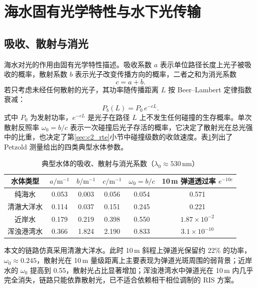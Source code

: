 \section{海水固有光学特性与水下光传输}
\label{sec:c2_water}

\subsection{吸收、散射与消光}

海水对光的作用由固有光学特性描述。吸收系数 $a$ 表示单位路径长度上光子被吸收的概率，散射系数 $b$ 表示光子改变传播方向的概率，二者之和为消光系数
\begin{equation}
c=a+b.
\label{eq:c2_extinction}
\end{equation}
若只考虑未经任何散射的光子，其功率随传播距离 $L$ 按 Beer--Lambert 定律指数衰减：
\begin{equation}
P_b(L)=P_0\,e^{-cL}.
\label{eq:c2_beer}
\end{equation}
式中 $P_0$ 为发射功率，$e^{-cL}$ 是光子在路径 $L$ 上不发生任何碰撞的生存概率。单次散射反照率 $\omega_0=b/c$ 表示一次碰撞后光子存活的概率，它决定了散射光在总光强中的比重，也决定了第\ref{sec:c2_rte}小节中碰撞级数的收敛速度。表\ref{tab:c2_iop}列出了 Petzold 测量给出的四类典型水体参数。

\begin{table}[htbp]
\caption{典型水体的吸收、散射与消光系数（$\lambda_0\approx530\,\mathrm{nm}$）}
\label{tab:c2_iop}
\centering
\begin{tabular}{cccccc}
\toprule
水体类型 & $a/\mathrm{m^{-1}}$ & $b/\mathrm{m^{-1}}$ & $c/\mathrm{m^{-1}}$ & $\omega_0=b/c$ & 10\,m 弹道透过率 $e^{-10c}$ \\
\midrule
纯海水 & 0.053 & 0.003 & 0.056 & 0.054 & 0.571 \\
清澈大洋水 & 0.114 & 0.037 & 0.151 & 0.245 & 0.221 \\
近岸水 & 0.179 & 0.219 & 0.398 & 0.550 & $1.87\times10^{-2}$ \\
浑浊港湾水 & 0.366 & 1.824 & 2.190 & 0.833 & $3.1\times10^{-10}$ \\
\bottomrule
\end{tabular}
\end{table}

本文的链路仿真采用清澈大洋水。此时 10\,m 斜程上弹道光保留约 22\% 的功率，$\omega_0\approx0.245$，散射光在 10\,m 量级距离上主要表现为弹道光斑周围的弱背景；近岸水的 $\omega_0$ 提高到 0.55，散射光占比显著增加；浑浊港湾水中弹道光在 10\,m 内几乎完全消失，链路只能依靠散射光，已不适合依赖相干相位调制的 RIS 方案。

